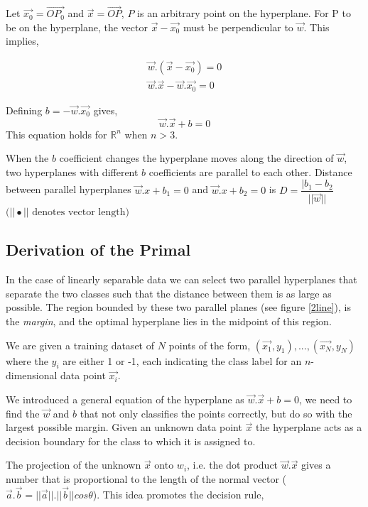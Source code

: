 \documentclass[final,3p,times,twocolumn]{elsarticle}
\begin{document}
Let $\vec{x_{0}} = \vec{OP_{0}}$ and $\vec{x} = \vec{OP}$, $P$ is an arbitrary point on the hyperplane. For P to be on the hyperplane, the vector $\vec{x} - \vec{x_{0}}$ must be perpendicular to $\vec{w}$. This implies, 

\begin{align}
\vec{w}.(\vec{x} - \vec{x_{0}}) = 0  \\
\vec{w}.\vec{x} - \vec{w}.\vec{x_{0}} = 0
\end{align}

Defining $b = -\vec{w}.\vec{x_{0}}$ gives, $$\vec{w}.\vec{x} + b = 0$$ This equation holds for $\mathbb{R}^n$ when $n > 3$. 

When the $b$ coefficient changes the hyperplane moves along the direction of $\vec{w}$, two hyperplanes with different $b$ coefficients are parallel to each other. Distance between parallel hyperplanes $\vec{w}.{x} + b_{1} = 0$ and  $\vec{w}.{x} + b_{2} = 0$ is $D = \dfrac{|b_{1} - b_{2}}{||\vec{w}||}$ 
$(||\bullet|| \textrm{ denotes vector length) }$

\subsection{Derivation of the Primal} 
\label{primal}

In the case of linearly separable data we can select two parallel hyperplanes that separate the two classes such that the distance between them is as large as possible. The region bounded by these two parallel planes (see figure \ref{2line}), is the \textit{margin}, and the optimal hyperplane lies in the midpoint of this region. 

We are given a training dataset of $N$ points of the form, $(\vec{x_{1}},y_{1}),...,(\vec{x_{N}},y_{N})$ where the $y_{i}$ are either 1 or -1, each indicating the class label for an $n$-dimensional data point $\vec{x_{i}}$. 

We introduced a general equation of the hyperplane as  $\vec{w}.\vec{x} + b = 0$, we need to find the $\vec{w}$ and $b$ that not only classifies the points correctly, but do so with the largest possible margin. Given an unknown data point $\vec{x}$ the hyperplane acts as a decision boundary for the class to which it is assigned to. 

The projection of the unknown $\vec{x}$ onto $w_{i}$, i.e. the dot product $\vec{w}.\vec{x}$ gives a number that is proportional to the length of the normal vector ($\vec{a}.\vec{b} = || \vec{a}||.||\vec{b}||cos\theta$). This idea promotes the decision rule,\\
\end{document}
